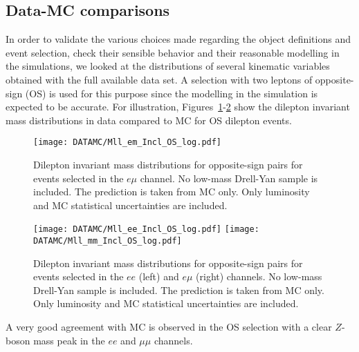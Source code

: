 \subsection{Data-MC comparisons}
\label{subsec:sec.strategy.selection_DataMC}


In order to validate the various choices made regarding the object definitions and event selection, 
check their sensible behavior and their reasonable modelling in the simulations, 
we looked at the distributions of several kinematic variables obtained with the full available data set.
A selection with two leptons of opposite-sign (OS) is used for this purpose since the modelling in the simulation 
is expected to be accurate.
For illustration, Figures~\ref{fig:dataMC_2em.os}-\ref{fig:dataMC_2ll.os} 
show the dilepton invariant mass distributions in data compared to MC for OS dilepton events.
\begin{figure}[htb!]
\centering
{\texttt{[image: DATAMC/Mll\_em\_Incl\_OS\_log.pdf]}}
\caption{Dilepton invariant mass distributions for opposite-sign pairs for events selected in the $e\mu$ channel. 
No low-mass Drell-Yan sample is included. 
 The prediction is taken from MC only.
Only luminosity and MC statistical uncertainties are included.
}
\label{fig:dataMC_2em.os}
\end{figure}
\begin{figure}[htb!]
\centering
{\texttt{[image: DATAMC/Mll\_ee\_Incl\_OS\_log.pdf]}}
{\texttt{[image: DATAMC/Mll\_mm\_Incl\_OS\_log.pdf]}}
\caption{Dilepton invariant mass distributions for opposite-sign pairs for events selected in the $ee$ (left) and $e\mu$ (right) channels. 
No low-mass Drell-Yan sample is included. 
 The prediction is taken from MC only.
Only luminosity and MC statistical uncertainties are included.
}
\label{fig:dataMC_2ll.os}
\end{figure}
A very good agreement with MC is observed in the OS selection with a clear $Z$-boson mass peak in the $ee$ and $\mu\mu$ channels. 

